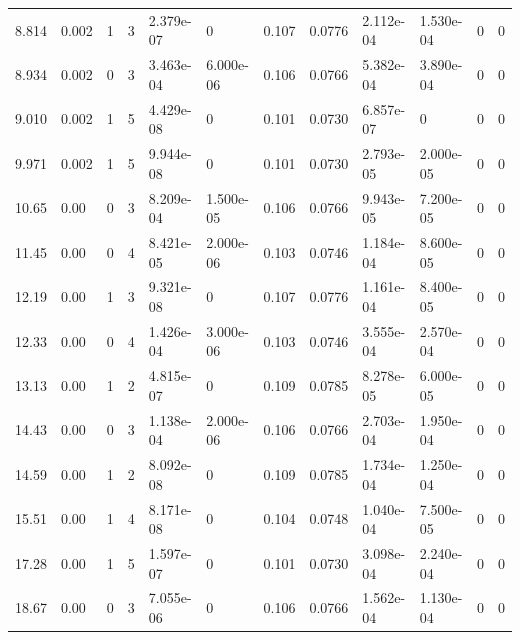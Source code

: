\documentclass[preview]{standalone}
\begin{document}
{{\begin{tabular}{L{1.2cm}C{1.2cm} C{0.3cm}C{0.5cm} C{1.4cm}C{1.4cm} C{1.4cm}C{1.4cm} C{1.6cm}C{1.6cm} C{1.6cm}C{1.6cm}}
  8.814  &  0.002  & 1     &  3 &  2.379e-07  & 0  &  0.107&   0.0776& 2.112e-04 & 1.530e-04   &  0 & 0  \\ 
  8.934  &  0.002  & 0     &  3 &  3.463e-04  & 6.000e-06  &  0.106&   0.0766& 5.382e-04 & 3.890e-04   &  0 & 0  \\ 
  9.010  &  0.002  & 1     &  5 &  4.429e-08  & 0  &  0.101&   0.0730& 6.857e-07 & 0   &  0 & 0  \\ 
  9.971  &  0.002  & 1     &  5 &  9.944e-08  & 0  &  0.101&   0.0730& 2.793e-05 & 2.000e-05   &  0 & 0  \\ 
  10.65  &  0.00  & 0     &  3 &  8.209e-04  & 1.500e-05  &  0.106&   0.0766& 9.943e-05 & 7.200e-05   &  0 & 0  \\ 
  11.45  &  0.00  & 0     &  4 &  8.421e-05  & 2.000e-06  &  0.103&   0.0746& 1.184e-04 & 8.600e-05   &  0 & 0  \\ 
  12.19  &  0.00  & 1     &  3 &  9.321e-08  & 0  &  0.107&   0.0776& 1.161e-04 & 8.400e-05   &  0 & 0  \\ 
  12.33  &  0.00  & 0     &  4 &  1.426e-04  & 3.000e-06  &  0.103&   0.0746& 3.555e-04 & 2.570e-04   &  0 & 0  \\ 
  13.13  &  0.00  & 1     &  2 &  4.815e-07  & 0  &  0.109&   0.0785& 8.278e-05 & 6.000e-05   &  0 & 0  \\ 
  14.43  &  0.00  & 0     &  3 &  1.138e-04  & 2.000e-06  &  0.106&   0.0766& 2.703e-04 & 1.950e-04   &  0 & 0  \\ 
  14.59  &  0.00  & 1     &  2 &  8.092e-08  & 0  &  0.109&   0.0785& 1.734e-04 & 1.250e-04   &  0 & 0  \\ 
  15.51  &  0.00  & 1     &  4 &  8.171e-08  & 0  &  0.104&   0.0748& 1.040e-04 & 7.500e-05   &  0 & 0  \\ 
  17.28  &  0.00  & 1     &  5 &  1.597e-07  & 0  &  0.101&   0.0730& 3.098e-04 & 2.240e-04   &  0 & 0  \\ 
  18.67  &  0.00  & 0     &  3 &  7.055e-06  & 0  &  0.106&   0.0766& 1.562e-04 & 1.130e-04   &  0 & 0  \\ 
\hline 
\end{tabular} 

}}
\end{document}
